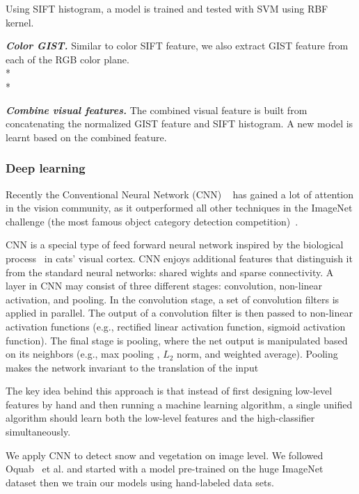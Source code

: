 \documentclass[10pt,journal,compsoc]{IEEEtran}
\begin{document}
Using SIFT histogram, a model is trained and tested with SVM using RBF kernel. 

\textbf{\textit{Color GIST.}}
Similar to color SIFT feature, we also extract GIST feature from each of the RGB color plane.\\*\\*

\textbf{\textit{Combine visual features.}}
The combined visual feature is built from concatenating the normalized GIST feature and SIFT histogram. A new model is learnt based on the combined feature.

\subsubsection{Deep learning}
Recently the Conventional Neural Network (CNN) ~\cite{krizhevsky2012imagenet} has gained a lot of attention in the vision community, as it outperformed all other techniques in the ImageNet challenge (the most famous object category detection competition)~\cite{ilsvrcarxiv14}.



CNN is a special type of feed forward neural network inspired by the biological process~\cite{krizhevsky2012imagenet} in cats' visual cortex. 
CNN enjoys additional features that distinguish it from the standard neural networks: shared wights and sparse connectivity.
A layer in CNN may consist of three different stages: convolution, non-linear activation, and pooling.
In the convolution stage, a set of convolution filters is applied in parallel. 
The output of a convolution filter is then passed to non-linear activation functions (e.g., rectified linear activation function, sigmoid activation function).
The final stage is pooling, where the net output is manipulated based on its neighbors (e.g., max pooling , $L_2$ norm, and weighted average).
Pooling makes the network invariant to the translation of the input

The key idea behind this approach is that instead of first designing low-level features by
hand and then running a machine learning algorithm, a single unified
algorithm should learn both the low-level features and the
high-classifier simultaneously. 

We apply CNN to detect snow and vegetation on image level. We followed Oquab~\cite{Oquab14} et al. and started with a model
pre-trained on the huge ImageNet dataset then we train our models using hand-labeled data sets.
 
\end{document}
